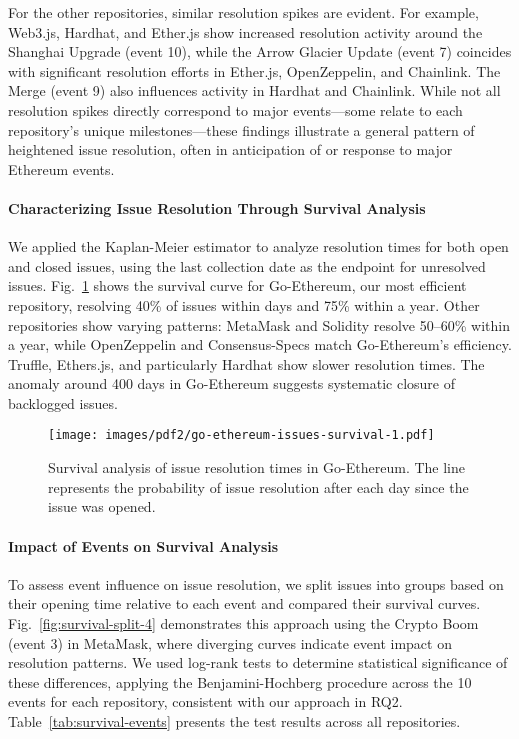 For the other repositories, similar resolution spikes are evident. For example, Web3.js, Hardhat, and Ether.js show increased resolution activity around the Shanghai Upgrade (event 10), while the Arrow Glacier Update (event 7) coincides with significant resolution efforts in Ether.js, OpenZeppelin, and Chainlink. The Merge (event 9) also influences activity in Hardhat and Chainlink.
While not all resolution spikes directly correspond to major events—some relate to each repository’s unique milestones—these findings illustrate a general pattern of heightened issue resolution, often in anticipation of or response to major Ethereum events. 

\paragraph{Characterizing Issue Resolution Through Survival Analysis}
We applied the Kaplan-Meier estimator to analyze resolution times for both open and closed issues, using the last collection date as the endpoint for unresolved issues. Fig.~\ref{fig:survival} shows the survival curve for Go-Ethereum, our most efficient repository, resolving 40\% of issues within days and 75\% within a year. Other repositories show varying patterns: MetaMask and Solidity resolve 50--60\% within a year, while OpenZeppelin and Consensus-Specs match Go-Ethereum's efficiency. Truffle, Ethers.js, and particularly Hardhat show slower resolution times. The anomaly around 400 days in Go-Ethereum suggests systematic closure of backlogged issues.

\begin{figure}
    \centering
    \texttt{[image: images/pdf2/go-ethereum-issues-survival-1.pdf]}
    \caption{Survival analysis of issue resolution times in Go-Ethereum. The line represents the probability of issue resolution after each day since the issue was opened.}
    \label{fig:survival}
\end{figure}

\paragraph{Impact of Events on Survival Analysis}
To assess event influence on issue resolution, we split issues into groups based on their opening time relative to each event and compared their survival curves. Fig.~\ref{fig:survival-split-4} demonstrates this approach using the Crypto Boom (event 3) in MetaMask, where diverging curves indicate event impact on resolution patterns. 
We used log-rank tests to determine statistical significance of these differences, applying the Benjamini-Hochberg procedure across the 10 events for each repository, consistent with our approach in RQ2.
Table~\ref{tab:survival-events} presents the test results across all repositories. 



